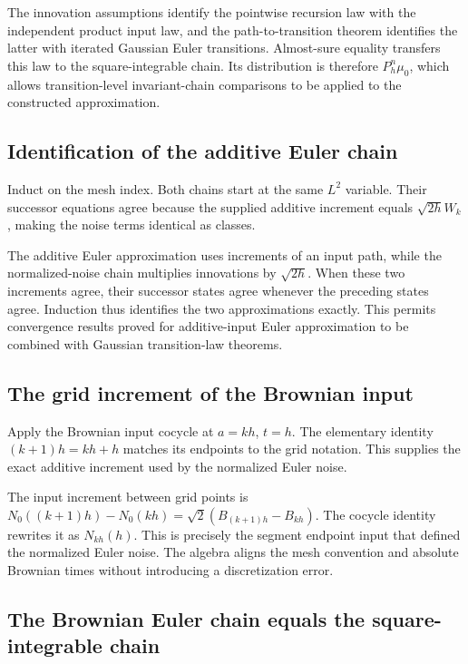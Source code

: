 \documentclass[11pt,a4paper]{article}
\begin{document}
The innovation assumptions identify the pointwise recursion law with the independent product input law, and the path-to-transition theorem identifies the latter with iterated Gaussian Euler transitions. Almost-sure equality transfers this law to the square-integrable chain. Its distribution is therefore \(P_h^n\mu_0\), which allows transition-level invariant-chain comparisons to be applied to the constructed approximation.


\subsection{\texorpdfstring{Identification of the additive Euler chain}{Identification of the additive Euler chain}}


Induct on the mesh index. Both chains start at the same \(L^2\) variable. Their successor equations agree because the supplied additive increment equals \(\sqrt{2h}W_k\), making the noise terms identical as classes.



The additive Euler approximation uses increments of an input path, while the normalized-noise chain multiplies innovations by \(\sqrt{2h}\). When these two increments agree, their successor states agree whenever the preceding states agree. Induction thus identifies the two approximations exactly. This permits convergence results proved for additive-input Euler approximation to be combined with Gaussian transition-law theorems.


\subsection{\texorpdfstring{The grid increment of the Brownian input}{The grid increment of the Brownian input}}


Apply the Brownian input cocycle at \(a=kh\), \(t=h\). The elementary identity \((k+1)h=kh+h\) matches its endpoints to the grid notation. This supplies the exact additive increment used by the normalized Euler noise.



The input increment between grid points is \(N_0((k+1)h)-N_0(kh)=\sqrt2(B_{(k+1)h}-B_{kh})\). The cocycle identity rewrites it as \(N_{kh}(h)\). This is precisely the segment endpoint input that defined the normalized Euler noise. The algebra aligns the mesh convention and absolute Brownian times without introducing a discretization error.


\subsection{\texorpdfstring{The Brownian Euler chain equals the square-integrable chain}{The Brownian Euler chain equals the square-integrable chain}}
\end{document}
